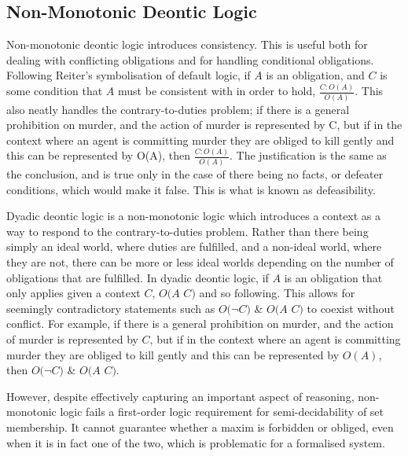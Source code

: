 \documentclass{l4proj}
\begin{document}
\subsection{Non-Monotonic Deontic Logic}
Non-monotonic deontic logic introduces consistency\cite{Powers}. This is useful both for dealing with conflicting obligations and for handling conditional obligations\cite{Horty}. Following Reiter's symbolisation of default logic\cite{Reiter}, if $A$ is an obligation, and $C$ is some condition that $A$ must be consistent with in order to hold, \( \frac{C : O(A)}{O(A)} \). This also neatly handles the contrary-to-duties problem; if there is a general prohibition on murder, and the action of murder is represented by C, but if in the context where an agent is committing murder they are obliged to kill gently and this can be represented by O(A), then \( \frac{C : O(A)}{O(A)} \). The justification is the same as the conclusion, and is true only in the case of there being no facts, or defeater conditions, which would make it false. This is what is known as defeasibility. 

Dyadic deontic logic is a non-monotonic logic which introduces a context as a way to respond to the contrary-to-duties problem. Rather than there being simply an ideal world, where duties are fulfilled, and a non-ideal world, where they are not, there can be more or less ideal worlds depending on the number of obligations that are fulfilled. In dyadic deontic logic, if $A$ is an obligation that only applies given a context $C$, $O(A$ \textbar $C)$ and so following. This allows for seemingly contradictory statements such as $O($\( \neg \)$C)$ \& $O(A$ \textbar $C)$ to coexist without conflict. For example, if there is a general prohibition on murder, and the action of murder is represented by $C$, but if in the context where an agent is committing murder they are obliged to kill gently and this can be represented by $O(A)$, then $O($\( \neg \)$C)$ \& $O(A$ \textbar $C)$. 

However, despite effectively capturing an important aspect of reasoning, non-monotonic logic fails a first-order logic requirement for semi-decidability of set membership. It cannot guarantee whether a maxim is forbidden or obliged, even when it is in fact one of the two, which is problematic for a formalised system. 
\end{document}
